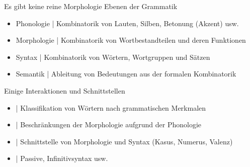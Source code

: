 \begin{frame}
  {Es gibt keine reine Morphologie}
  \onslide<+->
  \onslide<+->
  Ebenen der Grammatik\\
  \Viertelzeile
  \begin{itemize}[<+->]
    \item \alert{Phonologie} | Kombinatorik von Lauten, Silben, Betonung (Akzent) usw.
    \item \alert{Morphologie} | Kombinatorik von Wortbestandteilen und deren Funktionen
    \item \alert{Syntax} | Kombinatorik von Wörtern, Wortgruppen und Sätzen
    \item \alert{Semantik} | Ableitung von Bedeutungen aus der formalen Kombinatorik
  \end{itemize}
  \onslide<+->
  \Zeile
  Einige Interaktionen und Schnittstellen\\
  \Viertelzeile
  \begin{itemize}[<+->]
    \item {} | Klassifikation von Wörtern nach \alert{grammatischen Merkmalen}
    \item {} | Beschränkungen der \alert{Morphologie} aufgrund der \alert{Phonologie} 
    \item {} | Schnittstelle von Morphologie und Syntax (Kasus, Numerus, Valenz)
    \item {} | Passive, Infinitivsyntax usw.
  \end{itemize}
  \onslide<+->
  \Halbzeile
\end{frame}

